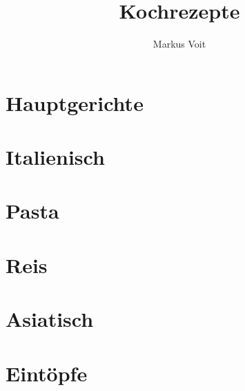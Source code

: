 \documentclass[DIV=11, pagesize, fontsize=11pt, paper=a4, numbers=noenddot]{scrartcl}
\title{Kochrezepte}
\author{Markus Voit}
\begin{document}
\maketitle

\tableofcontents
\clearpage

\section{Hauptgerichte}
\newpage{}
\newpage{}
\newpage{}

\section{Italienisch}
\newpage{}
\newpage{}
\newpage{}
\newpage{}

\section{Pasta}
\newpage{}
\newpage{}
\newpage{}
\newpage{}
\newpage{}

\section{Reis}
\newpage{}

\section{Asiatisch}
\newpage{}
\newpage{}
\newpage{}

\section{Eintöpfe}
\newpage{}
\newpage{}
\newpage{}
\newpage{}
\newpage{}
\newpage{}
\newpage{}
\end{document}
